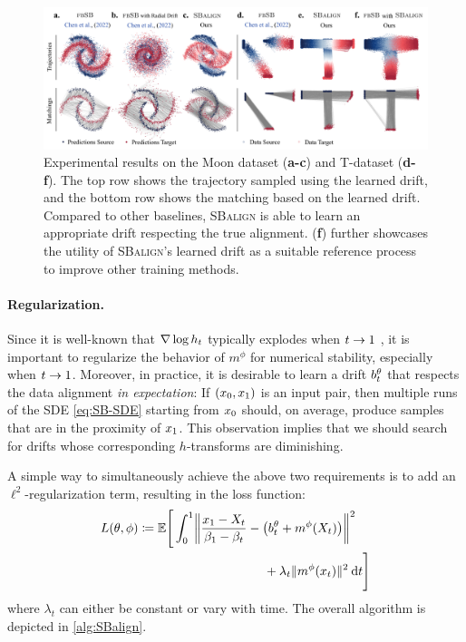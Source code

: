 \begin{figure}[t]
    \centering
    \includegraphics[width=\textwidth]{figures/fig_results_synthetic.pdf}
    \caption{Experimental results on the Moon dataset (\textbf{a-c}) and T-dataset (\textbf{d-f}). The top row shows the trajectory sampled using the learned drift, and the bottom row shows the matching based on the learned drift. Compared to other baselines, \textsc{SBalign} is able to learn an appropriate drift respecting the true alignment. (\textbf{f}) further showcases the utility of \textsc{SBalign}'s learned drift as a suitable reference process to improve other training methods.}
    \label{fig:results_spiral}
\end{figure}

\paragraph{Regularization.}
Since it is well-known that $\nabla \log h_t$ typically explodes when $t\to 1$ \citep{liu2023learning}, it is important to regularize the behavior of $m^{\phi}$ for numerical stability, especially when $t\to 1$. Moreover, in practice, it is desirable to learn a drift $b_t^\theta$ that respects the data alignment \emph{in expectation}: If $(x_0,x_1)$ is an input pair, then multiple runs of the \acrshort{SDE} \eqref{eq:SB-SDE} starting from $x_0$ should, on average, produce samples that are in the proximity of $x_1$. This observation implies that we should search for drifts whose corresponding $h$-transforms are diminishing.

A simple way to simultaneously achieve the above two requirements is to add an $\ell^2$-regularization term, resulting in the loss function:
\begin{align}
\label{eq:loss_final}
\Loss(\theta,\phi) &\defeq \mathbb{E} \Bigg[\int_0^1 \norm*{\frac{\x_1-X_t}{\cvolat[\horizon]-\cvolat[\ctime]}- \left(\fdrift^\theta + m^{\phi}(X_t)\right)}^2
\\ &\hspace{35mm}+ \lambda_t \norm{m^{\phi}(\x_t)}^2 \dt \Bigg]
\nonumber
\end{align}where $\lambda_t$ can either be constant or vary with time. The overall algorithm is depicted in \cref{alg:SBalign}.


